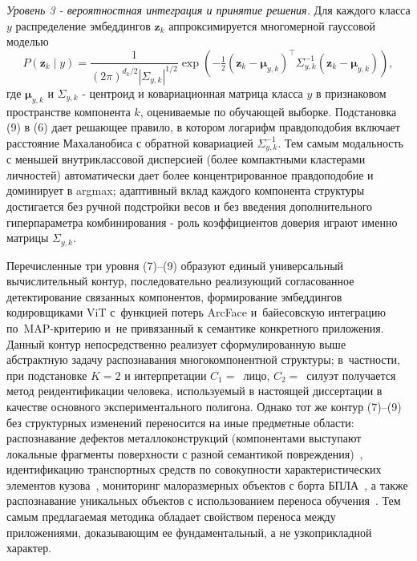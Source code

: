 \emph{Уровень 3 - вероятностная интеграция и принятие решения.}
Для каждого класса $y$ распределение эмбеддингов $\mathbf{z}_k$
аппроксимируется многомерной гауссовой моделью
\begin{equation}
    P(\mathbf{z}_k\mid y)=\frac{1}{(2\pi)^{d_k/2}|\Sigma_{y,k}|^{1/2}}\exp\!\left(-\tfrac{1}{2}(\mathbf{z}_k-\boldsymbol{\mu}_{y,k})^{\!\top}\Sigma_{y,k}^{-1}(\mathbf{z}_k-\boldsymbol{\mu}_{y,k})\right),
\end{equation}
где $\boldsymbol{\mu}_{y,k}$ и $\Sigma_{y,k}$ - центроид и ковариационная
матрица класса $y$ в признаковом пространстве компонента $k$, оцениваемые
по обучающей выборке. Подстановка (9) в (6) дает решающее правило, в
котором логарифм правдоподобия включает расстояние Махаланобиса с
обратной ковариацией $\Sigma_{y,k}^{-1}$. Тем самым модальность с меньшей
внутриклассовой дисперсией (более компактными кластерами личностей)
автоматически дает более концентрированное правдоподобие и доминирует в argmax;
адаптивный вклад каждого компонента структуры достигается без ручной
подстройки весов и без введения дополнительного гиперпараметра
комбинирования - роль коэффициентов доверия играют именно матрицы
$\Sigma_{y,k}$.

Перечисленные три уровня (7)--(9) образуют единый универсальный
вычислительный контур, последовательно реализующий согласованное
детектирование связанных компонентов, формирование эмбеддингов
кодировщиками ViT с~функцией потерь ArcFace и~байесовскую интеграцию
по~MAP-критерию и~не привязанный к семантике конкретного приложения. Данный контур
непосредственно реализует сформулированную выше абстрактную задачу
распознавания многокомпонентной структуры; в~частности, при подстановке
$K=2$ и интерпретации $C_1=$~лицо, $C_2=$~силуэт получается метод
реидентификации человека, используемый в настоящей диссертации в качестве
основного экспериментального полигона. Однако тот же контур (7)--(9) без
структурных изменений переносится на иные предметные области:
распознавание дефектов металлоконструкций (компонентами выступают
локальные фрагменты поверхности с разной семантикой
повреждения)~\cite{Rusakov2021corrosion}, идентификацию транспортных
средств по совокупности характеристических элементов
кузова~\cite{Rusakov2020license}, мониторинг малоразмерных объектов
с борта БПЛА~\cite{Rusakov2023uavspeed,Rusakov2024marine,Rusakov2023drowning},
а также распознавание уникальных объектов с использованием переноса
обучения~\cite{Rusakov2020transfer}. Тем самым предлагаемая методика
обладает свойством переноса между приложениями, доказывающим ее
фундаментальный, а не узкоприкладной характер.

